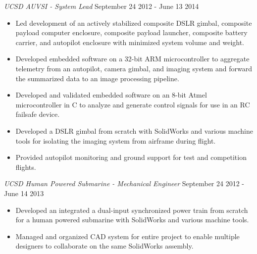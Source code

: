 \documentclass[line,margin]{res}
\begin{document}
\begin{resume}
	{\sl UCSD AUVSI - System Lead} \hfill September 24 2012 - June 13 2014
	\begin{itemize}
		\item Led development of an actively stabilized composite DSLR gimbal, composite payload computer enclosure, composite payload launcher, composite battery carrier, and autopilot enclosure with minimized system volume and weight.
		\item Developed embedded software on a 32-bit ARM microcontroller to aggregate telemetry from an autopilot, camera gimbal, and imaging system and forward the summarized data to an image processing pipeline.
		\item Developed and validated embedded software on an 8-bit Atmel microcontroller in C to analyze and generate control signals for use in an RC failsafe device.
		\item Developed a DSLR gimbal from scratch with SolidWorks and various machine tools for isolating the imaging system from airframe during flight.
		\item Provided autopilot monitoring and ground support for test and competition flights.
	\end{itemize}

	{\sl UCSD Human Powered Submarine - Mechanical Engineer} \hfill September 24 2012 - June 14 2013
	\begin{itemize}
		\item Developed an integrated a dual-input synchronized power train from scratch for a human powered submarine with SolidWorks and various machine tools.
		\item Managed and organized CAD system for entire project to enable multiple designers to collaborate on the same SolidWorks assembly.
	\end{itemize}



\end{resume}
\end{document}
